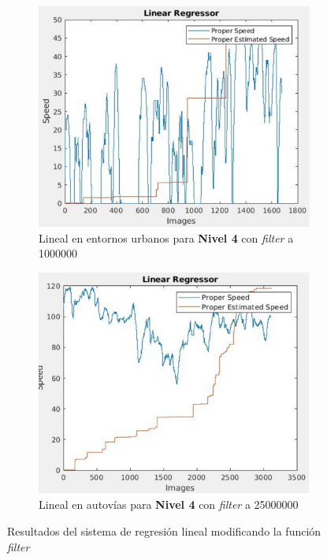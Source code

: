 \begin{figure}[H]
\centering
  \begin{subfigure}[b]{0.5\linewidth}
    \includegraphics[width=\linewidth]{Figuras/Linear_Urban(Nivel_4)(Filter_1000000).eps}
    \caption{Lineal en entornos urbanos para \textbf{Nivel 4} con \textit{filter} a 1000000}
  \end{subfigure}
  \begin{subfigure}[b]{0.5\linewidth}
    \includegraphics[width=\linewidth]{Figuras/Linear_Highway(Nivel_4)(Filter_25000000).eps}
    \caption{Lineal en autovías para \textbf{Nivel 4} con \textit{filter} a 25000000}
  \end{subfigure}
  \caption{Resultados del sistema de regresión lineal modificando la función \textit{filter}}
\end{figure}

